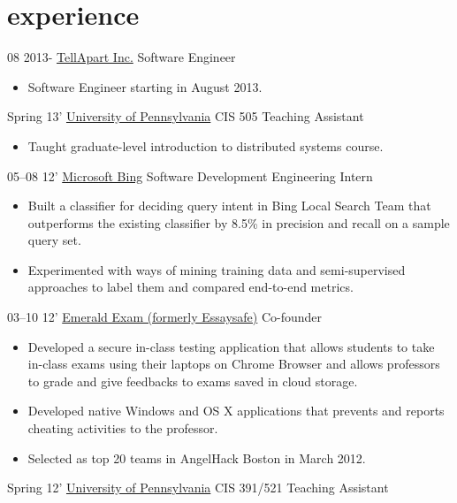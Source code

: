 \documentclass[]{patyoon-cv}
\begin{document}
\section{experience}

\begin{entrylist}
  \entry
      {08 2013-}
      {\href{http://tellapart.com/}{TellApart Inc.}}
      {Software Engineer}
      {\begin{itemize}
        \item Software Engineer starting in August 2013.  
        \end{itemize}
      } 
  \entry
      {Spring 13'}
      {\href{http://www.cis.upenn.edu/}{University of Pennsylvania}}
      {CIS 505 Teaching Assistant}
      {\begin{itemize}
        \item Taught graduate-level introduction to distributed systems course.
      \end{itemize}
      } 
  \entry
      {05–08 12'}
      {\href{http://bing.com/}{Microsoft Bing}}
      {Software Development Engineering Intern}
      {\begin{itemize}
        \item Built a classifier for deciding query intent in Bing Local Search Team that outperforms the existing classifier by 8.5\% in precision and recall on a sample query set.
        \item Experimented with ways of mining training data and semi-supervised approaches to label them and compared end-to-end metrics. 
        \end{itemize}} 
  \entry
    {03–10 12'}
    {\href{http://emeraldexam.com}{Emerald Exam (formerly Essaysafe)}}
    {Co-founder}
    {\begin{itemize}
      \item Developed a secure in-class testing application that allows students to take in-class exams using their laptops on Chrome Browser and allows professors to grade and give feedbacks to exams saved in cloud storage.
      \item Developed native Windows and OS X applications that prevents and reports cheating activities to the professor.
      \item Selected as top 20 teams in AngelHack Boston in March 2012.
      \end{itemize}} 
  \entry
    {Spring 12'}
    {\href{http://www.cis.upenn.edu/}{University of Pennsylvania}}
    {CIS 391/521 Teaching Assistant}
    {\begin{itemize}

\end{itemize}}
\end{entrylist}
\end{document}
